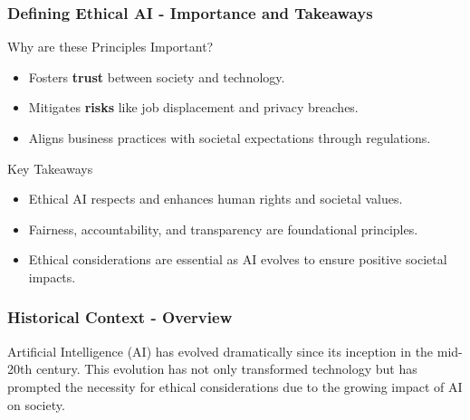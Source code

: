 \documentclass{beamer}
\begin{document}
\begin{frame}[fragile]
    \frametitle{Defining Ethical AI - Importance and Takeaways}
    \begin{block}{Why are these Principles Important?}
        \begin{itemize}
            \item Fosters \textbf{trust} between society and technology.
            \item Mitigates \textbf{risks} like job displacement and privacy breaches.
            \item Aligns business practices with societal expectations through regulations.
        \end{itemize}
    \end{block}
    \begin{block}{Key Takeaways}
        \begin{itemize}
            \item Ethical AI respects and enhances human rights and societal values.
            \item Fairness, accountability, and transparency are foundational principles.
            \item Ethical considerations are essential as AI evolves to ensure positive societal impacts.
        \end{itemize}
    \end{block}
\end{frame}

\begin{frame}[fragile]
    \frametitle{Historical Context - Overview}
    Artificial Intelligence (AI) has evolved dramatically since its inception in the mid-20th century. 
    This evolution has not only transformed technology but has prompted the necessity for ethical considerations due to the growing impact of AI on society.
\end{frame}
\end{document}
